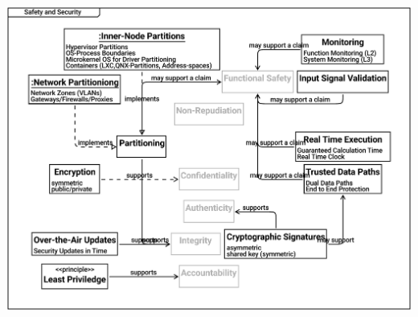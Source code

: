 \documentclass{article}
\begin{document}
\includegraphics[width= 1.0\linewidth]{quality_export/10_Safety_and_Security.pdf}

\end{document}
